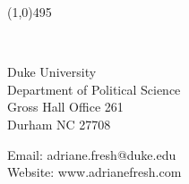 \documentclass[11pt]{article}
\begin{document}
\singlespacing
\setlength{\parindent}{0in}
\setlength{\parskip}{0in}


\thispagestyle{empty}





\noindent \Huge{\textbf{}}

\vspace{-.15in}
\line(1,0){495}









\vspace{0.2in}
\normalsize


\begin{minipage}[t]{.22\textwidth}
	\flushright
	 \hspace*{.2in}  \\
\end{minipage}
\begin{minipage}[t]{.4\textwidth}
	Duke University \\
	Department of Political Science \\
	Gross Hall Office 261 \\
	Durham NC 27708 \\

\end{minipage}
\begin{minipage}[t]{.45\textwidth}
	Email: adriane.fresh@duke.edu \\
	Website: www.adrianefresh.com
\end{minipage}





\end{document}
